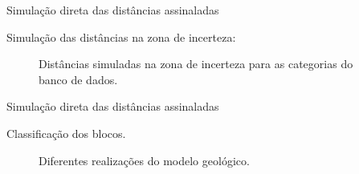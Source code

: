 \documentclass[aspectratio=169]{beamer}
\begin{document}
\begin{frame}{Simulação direta das distâncias assinaladas}

Simulação das distâncias na zona de incerteza:

	\begin{figure}[H] 
		\caption{Distâncias simuladas na zona de incerteza para as categorias do banco de dados.} \label{dist_sim_u}
		\centering
	\end{figure}
\end{frame}

\begin{frame}{Simulação direta das distâncias assinaladas}

Classificação dos blocos.

	\begin{figure}[H]
		\caption{Diferentes realizações do modelo geológico.} 
		\label{dif_real}
	\end{figure}
\end{frame}
\end{document}
